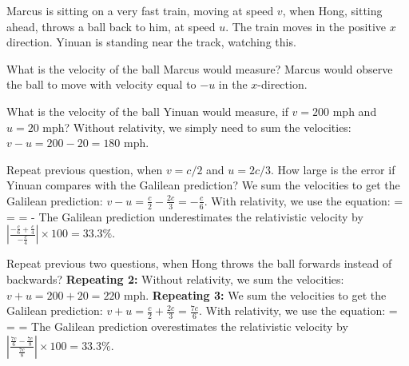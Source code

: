 Marcus is sitting on a very fast train, moving at speed $v$, when Hong, sitting ahead, throws a ball back to him, at speed $u$.  The train moves in the positive $x$ direction. Yinuan is standing near the track, watching this.
\benu
\item What is the velocity of the ball Marcus would measure?
\newline Marcus would observe the ball to move with velocity equal to $-u$ in the $x$-direction.

\item What is the velocity of the ball Yinuan would measure, if $v=200$ mph and $u=20$ mph?
\newline Without relativity, we simply need to sum the velocities: $v - u = 200 - 20 = 180 \text{ mph}$.

\item Repeat previous question, when $v=c/2$ and $u=2c/3$.  How large is the error if Yinuan compares with the Galilean prediction?
\newline We sum the velocities to get the Galilean prediction: $v - u = \frac{c}{2} - \frac{2c}{3} = -\frac{c}{6}$.
\newline With relativity, we use the equation:
\be
{} =  =  = -
\ee
The Galilean prediction underestimates the relativistic velocity by $\left| \frac{-\frac{c}{6} + \frac{c}{4}}{-\frac{c}{4}} \right| \times 100 = 33.3\%$.

\item Repeat previous two questions, when Hong throws the ball forwards instead of backwards? 
\textbf{Repeating 2:} Without relativity, we sum the velocities: $v + u = 200 + 20 = 220 \text{ mph}$.
\newline \textbf{Repeating 3:} We sum the velocities to get the Galilean prediction: $v + u = \frac{c}{2} + \frac{2c}{3} = \frac{7c}{6}$.
\newline With relativity, we use the equation:
\be
{} =  =  = 
\ee
The Galilean prediction overestimates the relativistic velocity by $\left| \frac{\frac{7c}{6} - \frac{7c}{8}}{\frac{7c}{8}} \right| \times 100 = 33.3\%$.

